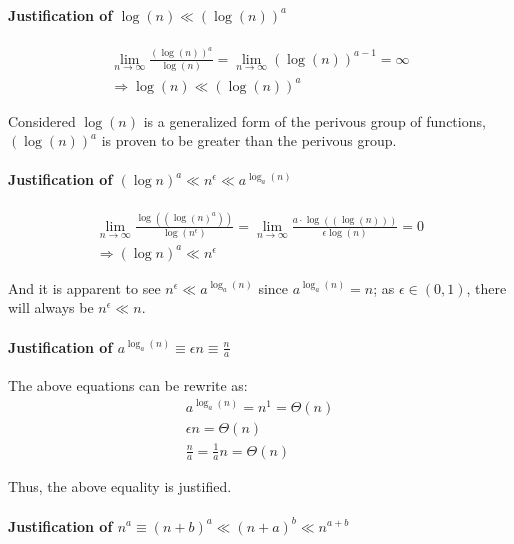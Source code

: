\documentclass[12pt]{article}
\begin{document}
\paragraph{Justification of $ \log(n)\ll  (\log (n))^a $\newline}
\begin{gather}
    \lim\limits_{n \to \infty} \frac{(\log (n))^a}{\log (n)} = \lim\limits_{n \to \infty} (\log(n))^{a-1} = \infty \nonumber \\
    \Rightarrow  \log(n)\ll  (\log (n))^a
\end{gather}

Considered $ \log(n)$ is a generalized form of the perivous group of functions,  $(\log (n))^a$ is proven to be greater than the perivous group.


\paragraph{Justification of $  (\log n)^a \ll n^{\epsilon} \ll a^{\log_a(n)}$\newline}

\begin{gather}
    \lim\limits_{n \to \infty} \frac{\log((\log(n)^a))}{\log(n^\epsilon)} = \lim\limits_{n \to \infty} \frac{a \cdot \log((\log(n)))}{\epsilon \log(n)} = 0 \nonumber \\
    \Rightarrow (\log n)^a \ll n^{\epsilon}
\end{gather}

And it is apparent to see $n^{\epsilon} \ll  a^{\log_a(n)}$ since $ a^{\log_a(n)} = n$; as $\epsilon \in (0, 1)$, there will always be $n^{\epsilon} \ll n$.

\paragraph{Justification of $a^{\log_a(n)} \equiv \epsilon n \equiv \frac{n}{a}$\newline}

The above equations can be rewrite as:
\begin{gather}
    a^{\log_a(n)} = n^1 = \Theta(n) \\
    \epsilon n = \Theta(n) \\
    \frac{n}{a} = \frac{1}{a}n =  \Theta(n)
\end{gather}

Thus, the above equality is justified.


\paragraph{Justification of $n^a \equiv (n+b)^a \ll (n+a)^b \ll n^{a+b}$\newline}
\end{document}
